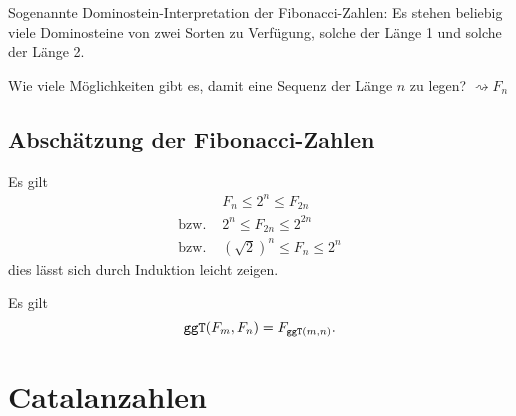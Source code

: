 Sogenannte Dominostein-Interpretation der Fibonacci-Zahlen:
Es stehen beliebig viele Dominosteine von zwei Sorten zu Verfügung, solche der Länge 1 und solche der Länge 2.

Wie viele Möglichkeiten gibt es, damit eine Sequenz der Länge $n$ zu legen? $\rightsquigarrow F_n$

\subsection{Abschätzung der Fibonacci-Zahlen}
Es gilt 
\begin{align*}
	&F_n\leq 2^n\leq F_{2n}\\
	\text{bzw. }&2^n\leq F_{2n}\leq 2^{2n}\\
	\text{bzw. }&(\sqrt 2)^n\leq F_n\leq 2^n
\end{align*}
dies lässt sich durch Induktion leicht zeigen.

Es gilt
\begin{equation*}
	\texttt{ggT}(F_m,F_n)=F_{\texttt{ggT}(m,n)}.
\end{equation*}



\section{Catalanzahlen}

